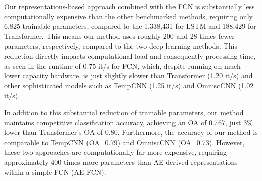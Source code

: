 \documentclass[journal,article,submit,pdftex,moreauthors]{Definitions/mdpi}
\begin{document}


Our representations-based approach combined with the FCN is substantially less computationally expensive than the other benchmarked methods, requiring only 6,825 trainable parameters, compared to the 1,338,431 for LSTM and 188,429 for Transformer. This means our method uses roughly 200 and 28 times fewer parameters, respectively, compared to the two deep learning methods. This reduction directly impacts computational load and consequently processing time, as seen in the runtime of 0.75 it/s for FCN, which, despite running on much lower capacity hardware, is just slightly slower than Transformer (1.20 it/s) and other sophisticated models such as TempCNN (1.25 it/s) and OmniscCNN (1.02 it/s).

In addition to this substantial reduction of trainable parameters, our method maintains competitive classification accuracy, achieving an OA of 0.767, just $3\%$ lower than Transformer's OA of 0.80. Furthermore, the accuracy of our method is comparable to TempCNN (OA=0.79) and OmniscCNN (OA=0.73). However, these two approaches are computationally far more expensive, requiring approximately 400 times more parameters than AE-derived representations within a simple FCN (AE-FCN).
\end{document}
